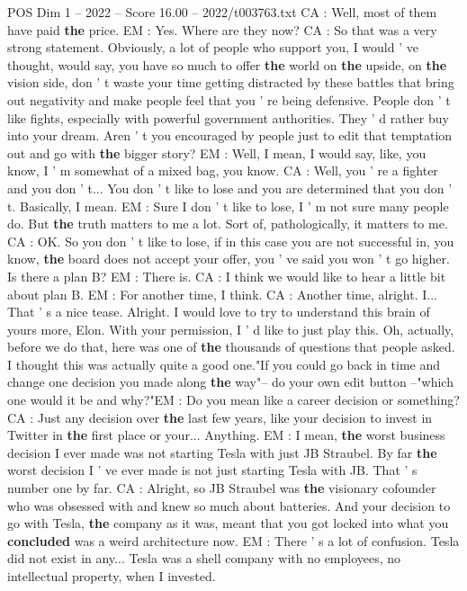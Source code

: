 \begin{textsample}{POS Dim 1 – 2022 – Score 16.00 – 2022/t003763.txt}
CA : Well, most of them have paid \textbf{the} price.
EM : Yes.
Where are they now?
CA : So that was a very strong statement.
Obviously, a lot of people who support you, I would ' ve thought, would say, you have so much to offer \textbf{the} world on \textbf{the} upside, on \textbf{the} vision side, don ' t waste your time getting distracted by these battles that bring out negativity and make people feel that you ' re being defensive.
People don ' t like fights, especially with powerful government authorities.
They ' d rather buy into your dream.
Aren ' t you encouraged by people just to edit that temptation out and go with \textbf{the} bigger story?
EM : Well, I mean, I would say, like, you know, I ' m somewhat of a mixed bag, you know.
CA : Well, you ' re a fighter and you don ' t...
You don ' t like to lose and you are determined that you don ' t.
Basically, I mean.
EM : Sure I don ' t like to lose, I ' m not sure many people do.
But \textbf{the} truth matters to me a lot.
Sort of, pathologically, it matters to me.
CA : OK.
So you don ' t like to lose, if in this case you are not successful in, you know, \textbf{the} board does not accept your offer, you ' ve said you won ' t go higher.
Is there a plan B?
EM : There is.
CA : I think we would like to hear a little bit about plan B.
EM : For another time, I think.
CA : Another time, alright.
I...
That ' s a nice tease.
Alright.
I would love to try to understand this brain of yours more, Elon.
With your permission, I ' d like to just play this.
Oh, actually, before we do that, here was one of \textbf{the} thousands of questions that people asked.
I thought this was actually quite a good one."If you could go back in time and change one decision you made along \textbf{the} way"-- do your own edit button --"which one would it be and why?"EM : Do you mean like a career decision or something?
CA : Just any decision over \textbf{the} last few years, like your decision to invest in Twitter in \textbf{the} first place or your...
Anything.
EM : I mean, \textbf{the} worst business decision I ever made was not starting Tesla with just JB Straubel.
By far \textbf{the} worst decision I ' ve ever made is not just starting Tesla with JB.
That ' s number one by far.
CA : Alright, so JB Straubel was \textbf{the} visionary cofounder who was obsessed with and knew so much about batteries.
And your decision to go with Tesla, \textbf{the} company as it was, meant that you got locked into what you \textbf{concluded} was a weird architecture now.
EM : There ' s a lot of confusion.
Tesla did not exist in any...
Tesla was a shell company with no employees, no intellectual property, when I invested.

\end{textsample}
